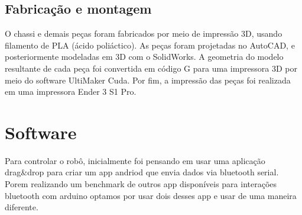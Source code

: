 \subsection{Fabricação e montagem}
O chassi e demais peças foram fabricados por meio de impressão 3D, usando filamento de PLA (ácido poliáctico). As
peças foram projetadas no AutoCAD, e posteriormente modeladas em 3D com o SolidWorks. A geometria do modelo
resultante de cada peça foi convertida em código G para uma impressora 3D por meio do software UltiMaker Cuda. Por
fim, a impressão das peças foi realizada em uma impressora Ender 3 S1 Pro.







\section{Software}
Para controlar o robô, inicialmente foi pensando em usar uma aplicação drag\&drop para criar um app andriod que envia dados via bluetooth serial.
Porem realizando um benchmark de outros app disponíveis para interações bluetooth com arduino optamos por usar dois desses app e usar de uma maneira diferente.


